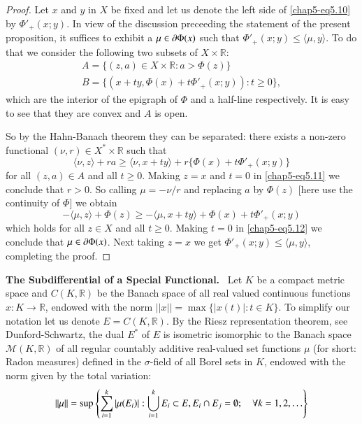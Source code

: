 \begin{proof}
Let $x$ and $y$ in $X$ be fixed and let us denote the left side of
\eqref{chap5-eq5.10} by $\Phi'_{+}(x;y)$. In view of the discussion
preceeding the statement of the present proposition, it suffices to
exhibit a $\mu\in \partial \Phi(x)$ such that $\Phi'_{+}(x;y)\leq
\langle\mu,y\rangle$. To do that we consider the following two subsets
of $X\times \mathbb{R}$:
\begin{gather*}
A=\{(z,a)\in X\times \mathbb{R}:a>\Phi(z)\}\\
B=\{(x+ty,\Phi(x)+t\Phi'_{+}(x;y)):t\geq 0\},
\end{gather*}
which are the interior of the epigraph of $\Phi$ and a half-line
respectively. It is easy to see that they are convex and $A$ is open.

So by the Hahn-Banach theorem they can be separated: there exists a
non-zero functional $(\nu,r)\in X^{*}\times \mathbb{R}$ such that
\begin{equation*}
\langle \nu,z\rangle +ra\geq \langle
\nu,x+ty\rangle+r\{\Phi(x)+t\Phi'_{+}(x;y)\}\tag{5.11}\label{chap5-eq5.11} 
\end{equation*}
for all $(z,a)\in A$ and all $t\geq 0$. Making $z=x$ and $t=0$ in
\eqref{chap5-eq5.11} we conclude that $r>0$. So calling $\mu=-\nu/r$
and replacing $a$ by $\Phi(z)$ [here use the continuity of $\Phi$] we
obtain 
\begin{equation*}
-\langle \mu, z\rangle+\Phi(z)\geq
-\langle\mu,x+ty\rangle+\Phi(x)+t\Phi'_{+}(x;y)\tag{5.12}\label{chap5-eq5.12} 
\end{equation*}
which holds for all $z\in X$ and all $t\geq 0$. Making $t=0$ in
\eqref{chap5-eq5.12} we conclude that $\mu\in \partial \Phi(x)$. Next taking
$z=x$ we get $\Phi'_{+}(x;y)\leq \langle \mu, y\rangle$, completing
the proof.
\end{proof}

\medskip
\noindent
{\bf The Subdifferential of a Special Functional.}~ Let $K$ be a
compact metric space and $C(K,\mathbb{R})$ be the Banach space of all
real valued continuous functions\pageoriginale $x:K\to \mathbb{R}$,
endowed with the norm $||x||=\max\{|x(t)|:t\in K\}$. To simplify our
notation let us denote $E=C(K,\mathbb{R})$. By the Riesz
representation theorem, see Dunford-Schwartz, \cite[p. 234]{key35} the
dual $E^{*}$ of $E$ is isometric isomorphic to the Banach space
$\mathcal{M}(K,\mathbb{R})$ of all regular countably additive
real-valued set functions $\mu$ (for short: Radon measures) defined in
the $\sigma$-field of all Borel sets in $K$, endowed with the norm
given by the total variation:
$$
||\mu||=\sup
\left\{\sum\limits^{k}_{i=1}|\mu(E_{i})|:\bigcup\limits^{k}_{i=1}E_{i}\subset
E, E_{i}\cap E_{j}=\emptyset;\quad \forall k=1,2,\ldots\right\}
$$

